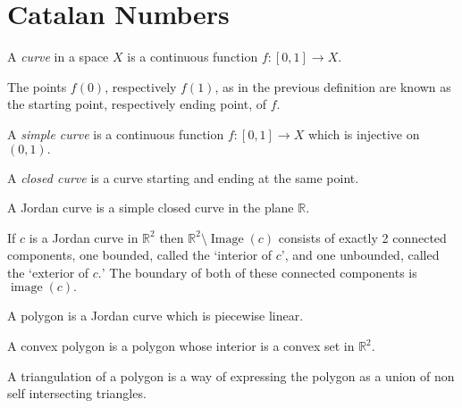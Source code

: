 \section{Catalan Numbers}
\begin{definition}[Curve]
	A \emph{curve} in a space $X$ is a continuous function $f \colon [0,1]
	\to X.$ 
\end{definition}
The points $f(0)$, respectively $f(1)$, as in the previous definition are known
as the starting point, respectively ending point, of $f.$
\begin{definition}
	A \emph{simple curve} is a continuous function $f \colon [0,1] \to X$
	which is injective on $(0,1).$
\end{definition}
\begin{definition}
	A \emph{closed curve} is a curve starting and ending at the same
	point.
\end{definition}
\begin{definition}
	A Jordan curve is a simple closed curve in the plane $\mathbb{R}.$	
\end{definition}
\begin{theorem}
	If $c$ is a Jordan curve in $\mathbb{R}^2$ then $\mathbb{R}^2
	\setminus \operatorname{Image}(c)$ consists of exactly 2 
	connected components, one bounded, called the `interior of $c$',
	and one unbounded, called the `exterior of $c.$' The boundary 
	of both of these connected components is $\operatorname{image}(c).$
\end{theorem}

\begin{definition}[Polygon]
	A polygon is a Jordan curve which is piecewise linear.
\end{definition}
\begin{definition}
	A convex polygon is a polygon whose interior is a convex set in
	$\mathbb{R}^2.$
\end{definition}

\begin{center}
\end{center}

A triangulation of a polygon is a way of expressing the polygon as
a union of non self intersecting triangles.

